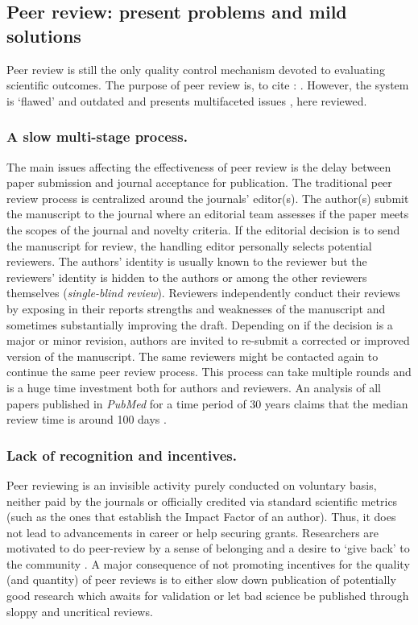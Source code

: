 \documentclass[runningheads]{llncs}
\begin{document}
\subsection{Peer review: present problems and mild solutions}
Peer review is still the only quality control mechanism devoted to evaluating scientific outcomes. The purpose of peer review is, to cite \cite{Gropp-PeerRevStress}: . However, the system is `ﬂawed' and outdated \cite{Smith2006} and presents multifaceted issues \cite{Walker2015-trends}, here reviewed.
\subsubsection{A slow multi-stage process.} The main issues affecting the effectiveness of peer review is the delay between paper submission and journal acceptance for publication. The traditional peer review process is centralized around the journals' editor(s). The author(s) submit the manuscript to the journal where an editorial team assesses if the paper meets the scopes of the journal and novelty criteria. If the editorial decision is to send the manuscript for review, the handling editor personally selects potential reviewers. The authors' identity is usually known to the reviewer but the reviewers' identity is hidden to the authors or among the other reviewers themselves (\emph{single-blind review}). Reviewers independently conduct their reviews by exposing in their reports strengths and weaknesses of the manuscript and sometimes substantially improving the draft. Depending on if the decision is a major or minor revision, authors are invited to re-submit a corrected or improved version of the manuscript. The same reviewers might be contacted again to continue the same peer review process. This process can take multiple rounds and is a huge time investment both for authors and reviewers. An analysis of all papers published in \emph{PubMed} for a time period of 30 years claims that the median review time is around 100 days \cite{Kendall-peerrev}.
\subsubsection{Lack of recognition and incentives.} Peer reviewing is an invisible activity purely conducted on voluntary basis, neither paid by the journals or officially credited via standard scientific metrics (such as the ones that establish the Impact Factor of an author). Thus, it does not lead to advancements in career or help securing grants. Researchers are motivated to do peer-review by a sense of belonging and a desire to `give back' to the community \cite{Warne-RewRev}. A major consequence of not promoting incentives for the quality (and quantity) of peer reviews is to either slow down publication of potentially good research which awaits for validation \cite{HauserIncent} or let bad science be published through sloppy and uncritical reviews.
\end{document}
